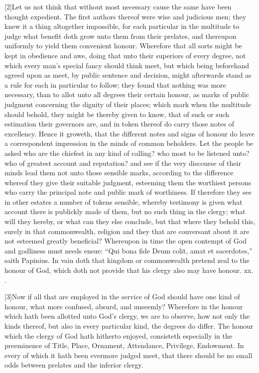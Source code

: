 [2]Let us not think that without most necessary cause the same have been thought expedient. The first authors thereof were wise and judicious men; they knew it a thing altogether impossible, for each particular in the multitude to judge what benefit doth grow unto them from their prelates, and thereupon uniformly to yield them convenient honour. Wherefore that all sorts might be kept in obedience and awe, doing that unto their superiors of every degree, not which every man’s special fancy should think meet, but which being beforehand agreed upon as meet, by public sentence and decision, might afterwards stand as a rule for each in particular to follow; they found that nothing was more necessary, than to allot unto all degrees their certain honour, as marks of public judgment concerning the dignity of their places; which mark when the multitude should behold, they might be thereby given to know, that of such or such estimation their governors are, and in token thereof do carry those notes of excellency. Hence it groweth, that the different notes and signs of honour do leave a correspondent impression in the minds of common beholders. Let the people be asked who are the chiefest in any kind of calling? who most to be listened unto? who of greatest account and reputation? and see if the very discourse of their minds lead them not unto those sensible marks, according to the difference whereof they give their suitable judgment, esteeming them the worthiest persons who carry the principal note and public mark of worthiness. If therefore they see in other estates a number of tokens sensible, whereby testimony is given what account there is publickly made of them, but no such thing in the clergy; what will they hereby, or what can they else conclude, but that where they behold this, surely in that commonwealth, religion and they that are conversant about it are not esteemed greatly beneficial? Whereupon in time the open contempt of God and godliness must needs ensue: “Qui bona fide Deum colit, amat et sacerdotes,” saith Papinius. In vain doth that kingdom or  commonwealth pretend zeal to the honour of God, which doth not provide that his clergy also may have honour. xx. .

[3]Now if all that are employed in the service of God should have one kind of honour, what more confused, absurd, and unseemly? Wherefore in the honour which hath been allotted unto God’s clergy, we are to observe, how not only the kinds thereof, but also in every particular kind, the degrees do differ. The honour which the clergy of God hath hitherto enjoyed, consisteth especially in the preeminence of Title, Place, Ornament, Attendance, Privilege, Endowment. In every of which it hath been evermore judged meet, that there should be no small odds between prelates and the inferior clergy.

